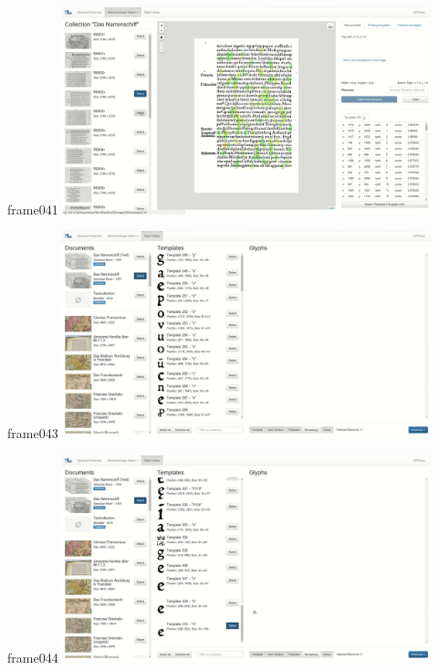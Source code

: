 \documentclass{beamer}
\begin{document}
\begin{frame}{frame041}
\includegraphics[width=0.8\textwidth]{output/exported-frames/frame041.png}
\note{}
\end{frame}

\begin{frame}{frame043}
\includegraphics[width=0.8\textwidth]{output/exported-frames/frame043.png}
\note{}
\end{frame}

\begin{frame}{frame044}
\includegraphics[width=0.8\textwidth]{output/exported-frames/frame044.png}
\note{}
\end{frame}
\end{document}
